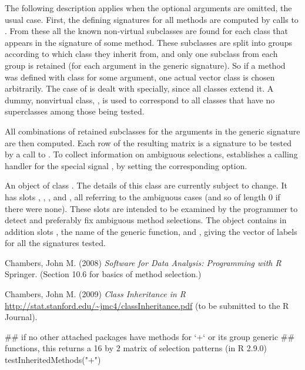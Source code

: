 \begin{Details}\relax
The following description applies when the optional arguments are
omitted, the usual case.
First, the defining signatures for all methods are computed by calls
to .
From these all the known non-virtual subclasses are found for each
class that appears in the signature of some method.
These subclasses are split into groups according to which class they
inherit from, and only one subclass from each group is retained (for
each argument in the generic signature).
So if a method was defined with class  for some
argument, one actual vector class is chosen arbitrarily.
The case of  is dealt with specially, since all classes
extend it.  A dummy, nonvirtual class, , is used to
correspond to all classes that have no superclasses among those being
tested.

All combinations of retained subclasses for the
arguments in the generic signature are then computed.
Each row of the resulting matrix is a signature to be tested by a call
to .
To collect information on ambiguous selections,
 establishes a calling handler for the
special signal , by setting the
corresponding option.
\end{Details}
%
\begin{Value}
An object of class .  The details of
this class are currently subject to change.  It has slots
, , , and
, all referring to the ambiguous cases (and so of length
0 if there were none).  These slots are intended to be examined by the
programmer to detect and preferably fix ambiguous method selections.
The object contains in addition slots , the name of
the generic function, and
,  giving the vector of labels for all
the signatures tested.
\end{Value}
%
\begin{References}\relax
Chambers, John M. (2008)
\emph{Software for Data Analysis: Programming with R}
Springer.  (Section 10.6 for basics of method selection.)

Chambers, John M. (2009)
\emph{Class Inheritance in R}
\url{http://stat.stanford.edu/~jmc4/classInheritance.pdf} (to be
submitted to the R Journal).
\end{References}
%
\begin{Examples}
\begin{ExampleCode}
## if no other attached  packages have methods for `+` or its group generic 
## functions, this returns a 16 by 2 matrix of selection patterns (in R 2.9.0)
testInheritedMethods("+")
\end{ExampleCode}
\end{Examples}
